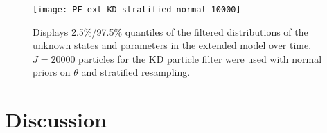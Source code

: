 \documentclass{elsarticle}
\begin{document}
\begin{figure}
\centering
\texttt{[image: PF-ext-KD-stratified-normal-10000]}
\caption{Displays 2.5\%/97.5\% quantiles of the filtered distributions of the unknown states and parameters in the extended model over time.  $J = 20000$ particles for the KD particle filter were used with normal priors on $\theta$ and stratified resampling.} \label{fig:ext}
\end{figure}

\section{Discussion \label{sec:discussion}}



\end{document}
